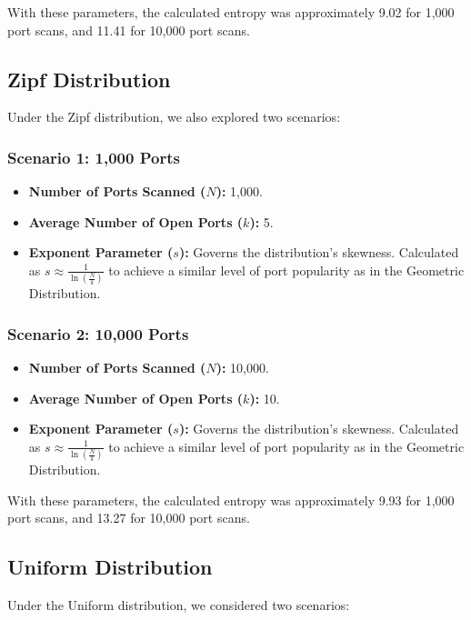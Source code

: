 With these parameters, the calculated entropy was approximately 9.02 for 1,000 port scans, and 11.41 for 10,000 port scans.

\subsection{Zipf Distribution}

Under the Zipf distribution, we also explored two scenarios:

\subsubsection{Scenario 1: 1,000 Ports}

\begin{itemize}
\item \textbf{Number of Ports Scanned (\(N\)):} 1,000.
\item \textbf{Average Number of Open Ports (\(k\)):} 5.
\item \textbf{Exponent Parameter (\(s\)):} Governs the distribution's skewness. Calculated as \(s \approx \frac{1}{\ln(\frac{N}{k})}\) to achieve a similar level of port popularity as in the Geometric Distribution.
\end{itemize}

\subsubsection{Scenario 2: 10,000 Ports}

\begin{itemize}
\item \textbf{Number of Ports Scanned (\(N\)):} 10,000.
\item \textbf{Average Number of Open Ports (\(k\)):} 10.
\item \textbf{Exponent Parameter (\(s\)):} Governs the distribution's skewness. Calculated as \(s \approx \frac{1}{\ln(\frac{N}{k})}\) to achieve a similar level of port popularity as in the Geometric Distribution.
\end{itemize}

With these parameters, the calculated entropy was approximately 9.93 for 1,000 port scans, and 13.27 for 10,000 port scans.

\subsection{Uniform Distribution}

Under the Uniform distribution, we considered two scenarios:

